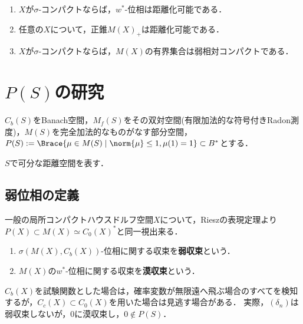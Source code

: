 \documentclass[uplatex,dvipdfmx]{jsreport}
\begin{document}
\begin{proposition}\mbox{}
    \begin{enumerate}
        \item $X$が$\sigma$-コンパクトならば，$w^*$-位相は距離化可能である．
        \item 任意の$X$について，正錐$M(X)_+$は距離化可能である．
        \item $X$が$\sigma$-コンパクトならば，$M(X)$の有界集合は弱相対コンパクトである．
    \end{enumerate}
\end{proposition}

\section{$P(S)$の研究}

\begin{tcolorbox}[colframe=ForestGreen, colback=ForestGreen!10!white,breakable,colbacktitle=ForestGreen!40!white,coltitle=black,fonttitle=\bfseries\sffamily,
title=]
    $C_b(S)$をBanach空間，$M_f(S)$をその双対空間(有限加法的な符号付きRadon測度)，$M(S)$を完全加法的なものがなす部分空間，
    $P(S):=\Brace{\mu\in M(S)\mid\norm{\mu}\le1,\mu(1)=1}\subset B^*$とする．
\end{tcolorbox}

\begin{notation}
    $S$で可分な距離空間を表す．
\end{notation}

\subsection{弱位相の定義}

\begin{definition}
    一般の局所コンパクトハウスドルフ空間$X$について，Rieszの表現定理より$P(X)\subset M(X)\simeq C_0(X)^*$と同一視出来る．
    \begin{enumerate}
        \item $\sigma(M(X),C_b(X))$-位相に関する収束を\textbf{弱収束}という．
        \item $M(X)$の$w^*$-位相に関する収束を\textbf{漠収束}という．
    \end{enumerate}
\end{definition}
\begin{remarks}
    $C_b(X)$を試験関数とした場合は，確率変数が無限遠へ飛ぶ場合のすべてを検知するが，$C_c(X)\subset C_0(X)$を用いた場合は見逃す場合がある．
    実際，$(\delta_n)$は弱収束しないが，$0$に漠収束し，$0\notin P(S)$．
\end{remarks}
\end{document}
